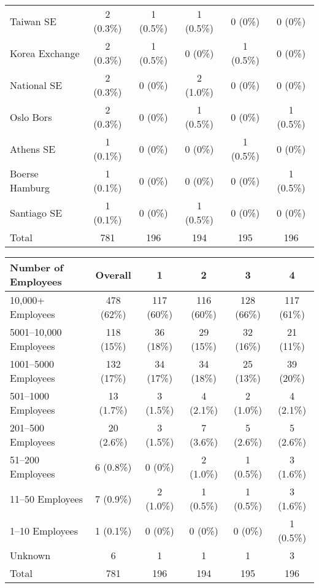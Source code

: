 \documentclass[12pt]{article}
\begin{document}
\begin{table}
\begin{tabular}{lccccc}
    Taiwan SE & 2 (0.3\%) & 1 (0.5\%) & 1 (0.5\%) & 0 (0\%) & 0 (0\%)\\
    Korea Exchange & 2 (0.3\%) & 1 (0.5\%) & 0 (0\%) & 1 (0.5\%) & 0 (0\%)\\
    National SE & 2 (0.3\%) & 0 (0\%) & 2 (1.0\%) & 0 (0\%) & 0 (0\%)\\
    Oslo Bors & 2 (0.3\%) & 0 (0\%) & 1 (0.5\%) & 0 (0\%) & 1 (0.5\%)\\
    Athens SE & 1 (0.1\%) & 0 (0\%) & 0 (0\%) & 1 (0.5\%) & 0 (0\%)\\
    Boerse Hamburg & 1 (0.1\%) & 0 (0\%) & 0 (0\%) & 0 (0\%) & 1 (0.5\%)\\
    Santiago SE & 1 (0.1\%) & 0 (0\%) & 1 (0.5\%) & 0 (0\%) & 0 (0\%)\\
    \midrule
    Total &  781 & 196 & 194 & 195 & 196 \\
    \bottomrule
\end{tabular}

\end{table}


\begin{table}
    \centering
    \label{tab:firm_size}
    
    \begin{tabular}{lccccc}
        \toprule
        Number of Employees & Overall & 1 & 2 & 3 & 4 \\
        \midrule
        10,000+ Employees & 478 (62\%) & 117 (60\%) & 116 (60\%) & 128 (66\%) & 117 (61\%)\\
        5001--10,000 Employees & 118 (15\%) & 36 (18\%) & 29 (15\%) & 32 (16\%) & 21 (11\%)\\
        1001--5000 Employees & 132 (17\%) & 34 (17\%) & 34 (18\%) & 25 (13\%) & 39 (20\%)\\
        501--1000 Employees & 13 (1.7\%) & 3 (1.5\%) & 4 (2.1\%) & 2 (1.0\%) & 4 (2.1\%)\\
        201--500 Employees & 20 (2.6\%) & 3 (1.5\%) & 7 (3.6\%) & 5 (2.6\%) & 5 (2.6\%)\\
        51--200 Employees & 6 (0.8\%) & 0 (0\%) & 2 (1.0\%) & 1 (0.5\%) & 3 (1.6\%)\\
        11--50 Employees & 7 (0.9\%) & 2 (1.0\%) & 1 (0.5\%) & 1 (0.5\%) & 3 (1.6\%)\\
        1--10 Employees & 1 (0.1\%) & 0 (0\%) & 0 (0\%) & 0 (0\%) & 1 (0.5\%)\\
        Unknown & 6 & 1 & 1 & 1 & 3\\
        \midrule
        Total &  781 & 196 & 194 & 195 & 196 \\
        \bottomrule
    \end{tabular}

\end{table}
\end{document}
